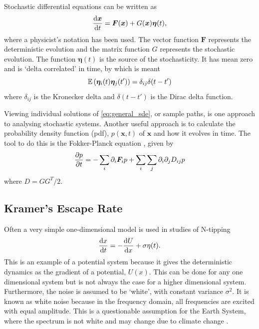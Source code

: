 Stochastic differential equations can be written \parencite{Jacobs2010} as
\begin{equation}
  \label{eq:general_sde}
  \dv{\bm{x}}{t} = \bm{F}(\bm{x}) + G(\bm{x})\bm{\eta}(t),
\end{equation}
where a physicist's notation has been used. The vector function $\bm{F}$ represents the deterministic evolution and the matrix function $G$ represents the stochastic evolution. The function
$\bm{\eta}(t)$ is the source of the stochasticity. It has mean zero and is `delta correlated' in time, by which is meant
\begin{equation}
  \label{eq:eta_correlation}
  \operatorname*{\mathbb{E}}\left(\bm{\eta}_i(t)\bm{\eta}_j(t')\right) = \delta_{ij}\delta(t-t')
\end{equation}
where $\delta_{ij}$ is the Kronecker delta and $\delta(t-t')$ is the Dirac delta function.

Viewing individual solutions of \cref{eq:general_sde}, or sample paths, is one approach  to analysing stochastic systems. Another useful approach is to calculate the probability density function
(pdf), $p(\bm{x},t)$ of $\bm{x}$ and how it evolves in time. The tool to do this is the Fokker-Planck equation \parencite{Fokker1914,Planck1917}, given by
\begin{equation}
  \label{eq:fokker_planck}
  \pdv{p}{t} = - \sum_i \partial_i \bm{F}_i p + \sum_i\sum_j \partial_i\partial_j D_{ij} p
\end{equation}
where $D = GG^T/2$.

\subsection{Kramer's Escape Rate}
Often a very simple one-dimensional model is used in studies of N-tipping
\begin{equation}
  \label{eq:simple_sde}
  \dv{x}{t} = -\dv{U}{x} + \sigma \eta(t).
\end{equation}
This is an example of a potential system because it gives the deterministic dynamics as the gradient of a potential, $U(x)$. This can be done for any one dimensional system but is not
always the case for a higher dimensional system. Furthermore, the noise is assumed to be `white', with constant variance $\sigma^2$. It is known as white noise because in the frequency domain, all
frequencies are excited with equal amplitude. This is a questionable assumption for the Earth System, where the spectrum is not white \parencite{Mitchell1976,VonderHeydt2021} and may
change due to climate change \parencite{Huntingford2013}.

